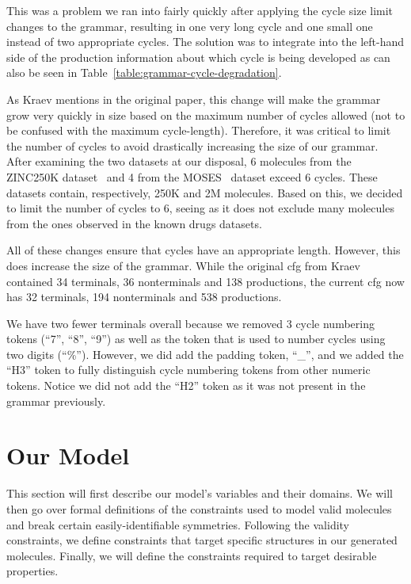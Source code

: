 \documentclass[../Document.tex]{subfiles}
\begin{document}
This was a problem we ran into fairly quickly after applying the cycle size limit changes to the grammar, resulting in one very long cycle and one small one instead of two appropriate cycles. The solution was to integrate into the left-hand side of the production information about which cycle is being developed as can also be seen in Table~\ref{table:grammar-cycle-degradation}.

As Kraev mentions in the original paper\cite{kraev2018grammars}, this change will make the grammar grow very quickly in size based on the maximum number of cycles allowed (not to be confused with the maximum cycle-length).
Therefore, it was critical to limit the number of cycles to avoid drastically increasing the size of our grammar.
After examining the two datasets at our disposal, 6 molecules from the ZINC250K dataset~\cite{Akhmetshin2021} and 4 from the MOSES~\cite{MOSES} dataset exceed 6 cycles. These datasets contain, respectively, 250K and 2M molecules. Based on this, we decided to limit the number of cycles to 6, seeing as it does not exclude many molecules from the ones observed in the known drugs datasets.

All of these changes ensure that cycles have an appropriate length. However, this does increase the size of the grammar. While the original \gls{cfg} from Kraev contained 34 terminals, 36 nonterminals and 138 productions, the current \gls{cfg} now has 32 terminals, 194 nonterminals and 538 productions.

We have two fewer terminals overall because we removed 3 cycle numbering tokens (``7'', ``8'', ``9'') as well as the token that is used to number cycles using two digits (``\%''). However, we did add the padding token, ``\_'', and we added the ``H3'' token to fully distinguish cycle numbering tokens from other numeric tokens. Notice we did not add the ``H2'' token as it was not present in the grammar previously.


\section{Our Model}
This section will first describe our model's variables and their domains.
We will then go over formal definitions of the constraints used to model valid molecules and break certain easily-identifiable symmetries.
Following the validity constraints, we define constraints that target specific structures in our generated molecules.
Finally, we will define the constraints required to target desirable properties.
\end{document}
